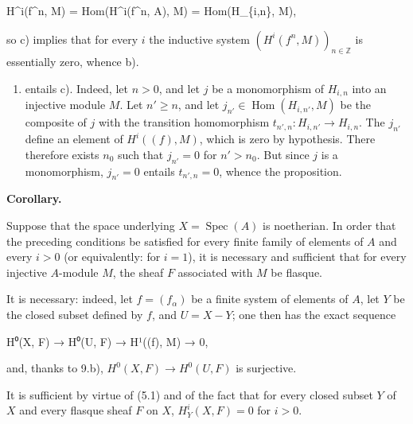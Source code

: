 \documentclass[
]{article}
\newenvironment{Shaded}{}{}
\newcommand{\NormalTok}[1]{#1}
\providecommand{\tightlist}{%
  \setlength{\itemsep}{0pt}\setlength{\parskip}{0pt}}
\begin{document}
\begin{Shaded}
\begin{Highlighting}[]
\NormalTok{H\^{}i(f\^{}n, M) = Hom(H\^{}i(f\^{}n, A), M) = Hom(H\_\{i,n\}, M),}
\end{Highlighting}
\end{Shaded}

so c) implies that for every \(i\) the inductive system
\((H^{i}(f^{n}, M))_{n \in \mathbb{Z}}\) is essentially zero, whence b).

\begin{enumerate}
\def\labelenumi{\alph{enumi})}
\setcounter{enumi}{1}
\tightlist
\item
  entails c). Indeed, let \(n > 0\), and let \(j\) be a monomorphism of
  \(H_{i,n}\) into an injective module \(M\). Let \(n' \geqslant n\),
  and let \(j_{n'} \in \operatorname{Hom}(H_{i,n'}, M)\) be the
  composite of \(j\) with the transition homomorphism
  \(t_{n',n}: H_{i,n'} \to H_{i,n}\). The \(j_{n'}\) define an element
  of \(H^{i}((f), M)\), which is zero by hypothesis. There therefore
  exists \(n_{0}\) such that \(j_{n'} = 0\) for \(n' > n_{0}\). But
  since \(j\) is a monomorphism, \(j_{n'} = 0\) entails
  \(t_{n',n} = 0\), whence the proposition.
\end{enumerate}

\textbf{Corollary.}

Suppose that the space underlying \(X = \operatorname{Spec}(A)\) is
noetherian. In order that the preceding conditions be satisfied for
every finite family of elements of \(A\) and every \(i > 0\) (or
equivalently: for \(i = 1\)), it is necessary and sufficient that for
every injective \(A\)-module \(M\), the sheaf \(F\) associated with
\(M\) be flasque.

It is necessary: indeed, let \(f = (f_{\alpha})\) be a finite system of
elements of \(A\), let \(Y\) be the closed subset defined by \(f\), and
\(U = X - Y\); one then has the exact sequence

\begin{Shaded}
\begin{Highlighting}[]
\NormalTok{H⁰(X, F) → H⁰(U, F) → H¹((f), M) → 0,}
\end{Highlighting}
\end{Shaded}

and, thanks to 9.b), \(H^{0}(X, F) \to H^{0}(U, F)\) is surjective.

It is sufficient by virtue of (5.1) and of the fact that for every
closed subset \(Y\) of \(X\) and every flasque sheaf \(F\) on \(X\),
\(H^{i}_{Y}(X, F) = 0\) for \(i > 0\).
\end{document}
